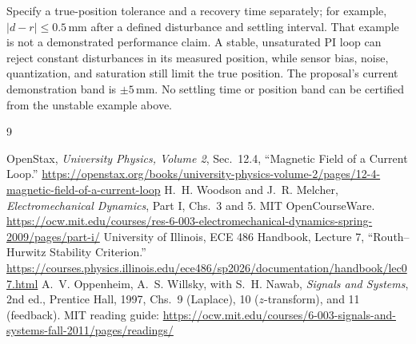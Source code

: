 \documentclass[11pt,letterpaper]{article}
\begin{document}
Specify a true-position tolerance and a recovery time separately; for example,
\(\lvert d-r\rvert\le0.5\,\mathrm{mm}\) after a defined disturbance and
settling interval. That example is not a demonstrated performance claim.
A stable, unsaturated PI loop can reject constant disturbances in its measured
position, while sensor bias, noise, quantization, and saturation still limit
the true position. The proposal's current demonstration band is
\(\pm5\,\mathrm{mm}\). No settling time or position band can be certified
from the unstable example above.

\clearpage
\begin{thebibliography}{9}
\raggedright
{} OpenStax, \emph{University Physics, Volume 2}, Sec.~12.4,
``Magnetic Field of a Current Loop.''
\url{https://openstax.org/books/university-physics-volume-2/pages/12-4-magnetic-field-of-a-current-loop}
 H.~H. Woodson and J.~R. Melcher,
\emph{Electromechanical Dynamics}, Part I, Chs.~3 and 5. MIT OpenCourseWare.
\url{https://ocw.mit.edu/courses/res-6-003-electromechanical-dynamics-spring-2009/pages/part-i/}
 University of Illinois, ECE 486 Handbook, Lecture 7,
``Routh--Hurwitz Stability Criterion.''
\url{https://courses.physics.illinois.edu/ece486/sp2026/documentation/handbook/lec07.html}
 A.~V. Oppenheim, A.~S. Willsky, with S.~H. Nawab,
\emph{Signals and Systems}, 2nd ed., Prentice Hall, 1997,
Chs.~9 (Laplace), 10 (\(z\)-transform), and 11 (feedback).
MIT reading guide:
\url{https://ocw.mit.edu/courses/6-003-signals-and-systems-fall-2011/pages/readings/}
\end{thebibliography}
\end{document}
